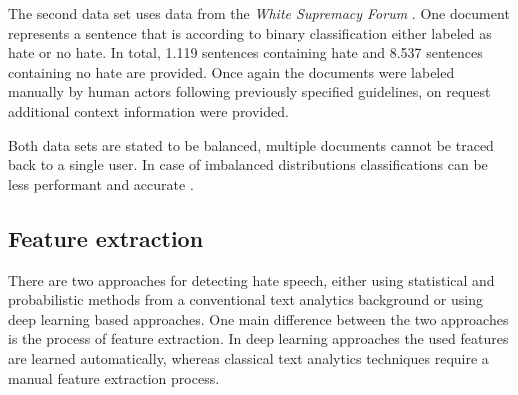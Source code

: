\noindent
The second data set uses data from the \textit{White Supremacy Forum} \cite{OnadeGibert.2020}. One document represents a sentence that is according to binary classification either labeled as hate or no hate. In total, 1.119 sentences containing hate and 8.537 sentences containing no hate are provided. Once again the documents were labeled manually by human actors following previously specified guidelines, on request additional context information were provided. 

\noindent
Both data sets are stated to be balanced, multiple documents cannot be traced back to a single user. In case of imbalanced distributions classifications can be less performant and accurate \cite{Oriola.2020}.

\subsection{Feature extraction}

There are two approaches for detecting hate speech, either using statistical and probabilistic methods from a conventional text analytics background or using deep learning based approaches. One main difference between the two approaches is the process of feature extraction. In deep learning approaches the used features are learned automatically, whereas classical text analytics techniques require a manual feature extraction process.

